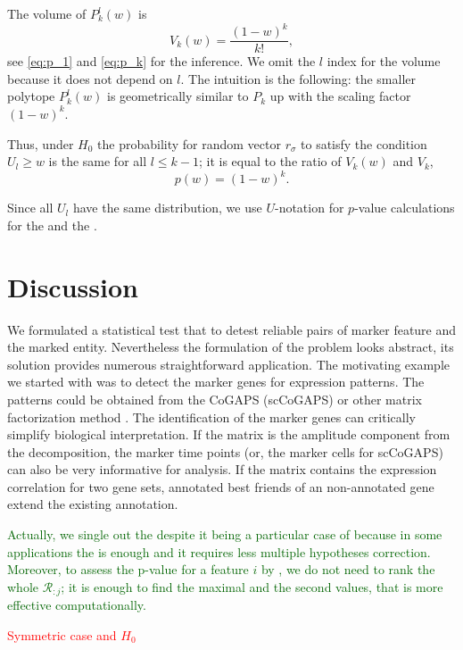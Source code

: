 \documentclass{llncs}
\begin{document}
The volume of $P^{l}_{k}(w)$ is 
\begin{equation}
V_{k}(w) = \frac{(1-w)^k}{k!},
\end{equation}
see \eqref{eq:p_1} and \eqref{eq:p_k} for the inference. We omit the $l$ index for the volume because it does not depend on $l$. The intuition is the following: the smaller polytope $P^{l}_{k}(w)$ is geometrically similar to $P_{k}$ up with the scaling factor $(1-w)^k$. 

Thus, under $H_0$ the probability for random vector $r_{\sigma}$ to satisfy the condition $U_{l} \ge w$ is the same for all $l\leq k-1$; it is equal to the ratio of $V_{k}(w)$ and $V_k$,
\[
p(w) = (1-w)^k.
\]

Since all $U_l$ have the same distribution, we use $U$-notation for $p$-value calculations for the  and the .


\section{Discussion}

We formulated a statistical test that to detest reliable pairs of marker feature and the marked entity. Nevertheless the formulation of the problem looks abstract, its solution provides numerous straightforward application. The motivating example we started with was to detect the marker genes for expression patterns. The patterns could be obtained from the CoGAPS (scCoGAPS) \cite{Fertig_2016} or other matrix factorization method \cite{Stein_2018}. The identification of the marker genes can critically simplify biological interpretation. If the matrix is the amplitude component from  the decomposition, the marker time points (or, the marker cells for scCoGAPS) can also be very informative for analysis. If the matrix contains the expression correlation for two gene sets, annotated best friends of an non-annotated gene extend the existing annotation.

\textcolor{darkgreen}{Actually, we single out the  despite it being a particular case of  because in some applications the  is enough and it requires less multiple hypotheses correction. Moreover, to assess the p-value for a feature $i$ by , we do not need to rank the whole $\mathcal{R}_{:j}$; it is enough to find the maximal and the second values, that is more effective computationally.}

\textcolor{red}{Symmetric case and $H_0$}
\end{document}
